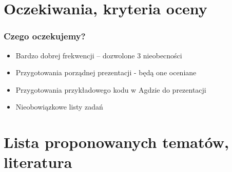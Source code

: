 \documentclass{beamer}
\begin{document}

\section{Oczekiwania, kryteria oceny}

\begin{frame}

\frametitle{Czego oczekujemy?}

\begin{itemize}
\item Bardzo dobrej frekwencji -- dozwolone 3 nieobecności \pause

\item Przygotowania porządnej prezentacji - będą one oceniane \pause

\item Przygotowania przykładowego kodu w Agdzie do prezentacji \pause

\item Nieobowiązkowe listy zadań

\end{itemize}






\end{frame}

\section{Lista proponowanych tematów, literatura}
\end{document}
